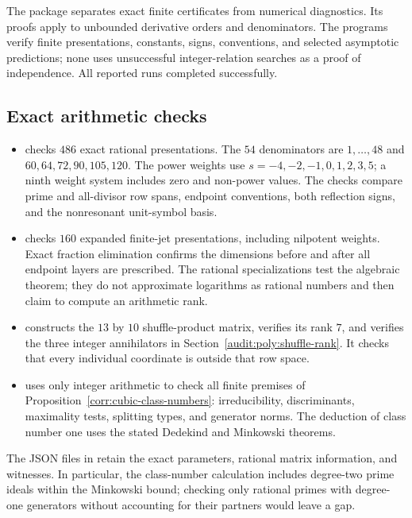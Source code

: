 \documentclass[11pt,a4paper]{article}
\theoremstyle{definition}
\theoremstyle{remark}
\numberwithin{equation}{section}
\begin{document}
The package separates exact finite certificates from numerical
diagnostics. Its proofs apply to unbounded derivative orders and
denominators. The programs verify finite presentations, constants,
signs, conventions, and selected asymptotic predictions; none uses
unsuccessful integer-relation searches as a proof of independence.
All reported runs completed successfully.

\subsection{Exact arithmetic checks}

\begin{itemize}
\item {} checks $486$ exact rational
presentations. The $54$ denominators are $1,\ldots,48$ and
$60,64,72,90,105,120$. The power weights use
$s=-4,-2,-1,0,1,2,3,5$; a ninth weight system includes zero and
non-power values. The checks compare prime and all-divisor row
spans, endpoint conventions, both reflection signs, and the
nonresonant unit-symbol basis.
\item {} checks $160$ expanded finite-jet
presentations, including nilpotent weights. Exact fraction elimination
confirms the dimensions before and after all endpoint layers are
prescribed. The rational specializations test the algebraic theorem;
they do not approximate logarithms as rational numbers and then claim
to compute an arithmetic rank.
\item {} constructs the $13$ by $10$
shuffle-product matrix, verifies its rank $7$, and verifies the three
integer annihilators in Section~\ref{audit:poly:shuffle-rank}. It checks
that every individual coordinate is outside that row space.
\item {} uses only integer
arithmetic to check all finite premises of
Proposition~\ref{corr:cubic-class-numbers}: irreducibility,
discriminants, maximality tests, splitting types, and generator norms.
The deduction of class number one uses the stated Dedekind and
Minkowski theorems.
\end{itemize}

The JSON files in  retain the exact parameters, rational
matrix information, and witnesses. In particular, the class-number
calculation includes degree-two prime ideals within the Minkowski
bound; checking only rational primes with degree-one generators
without accounting for their partners would leave a gap.
\end{document}
